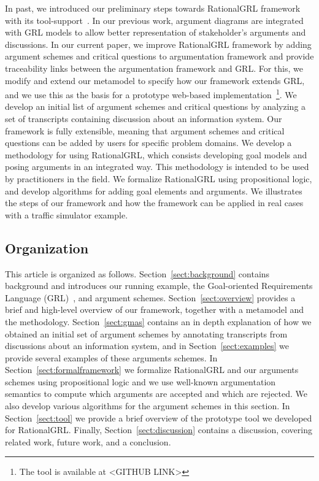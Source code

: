 In past, we introduced our preliminary steps towards RationalGRL framework~\cite{bnaic2014,vanzee-etal:renext2015,vanZee-etal:er2016} with its tool-support~\cite{vanZee-etal:comma2016}.  In our previous work, argument diagrams are integrated with GRL models to allow better representation of stakeholder's arguments and discussions. In our current paper, we improve RationalGRL framework by adding argument schemes and critical questions to argumentation framework and provide traceability links between the argumentation framework and GRL.  For this, we modify and extend our metamodel to specify how our framework extends GRL, and we use this as the basis for a prototype web-based implementation~\footnote{The tool is available at <GITHUB LINK>}. %
We develop an initial list of argument schemes and critical questions by analyzing a set of transcripts containing discussion about an information system. Our framework is fully extensible, meaning that argument schemes and critical questions can be added by users for specific problem domains. We develop a methodology for using RationalGRL, which consists developing goal models and posing arguments in an integrated way. This methodology is intended to be used by practitioners in the field. We formalize RationalGRL using propositional logic, and develop algorithms for adding goal elements and arguments. We illustrates the steps of our framework  and how the framework can be applied in real cases with a traffic simulator example.

\subsection{Organization} %

This article is organized as follows. Section~\ref{sect:background} contains background and introduces our running example, the Goal-oriented Requirements Language (GRL)~\cite{Amyot:2010:EGM:1841349.1841356}, and argument schemes. Section~\ref{sect:overview} provides a brief and high-level overview of our framework, together with a metamodel and the methodology. Section~\ref{sect:gmas} contains an in depth explanation of how we obtained an initial set of argument schemes by annotating transcripts from discussions about an information system, and in Section~\ref{sect:examples} we provide several examples of these arguments schemes. In Section~\ref{sect:formalframework} we formalize RationalGRL and our arguments schemes using propositional logic and we use well-known argumentation semantics to compute which arguments are accepted and which are rejected. We also develop various algorithms for the argument schemes in this section. In Section~\ref{sect:tool} we provide a brief overview of the prototype tool we developed for RationalGRL. Finally, Section~\ref{sect:discussion} contains a discussion, covering related work, future work, and a conclusion.